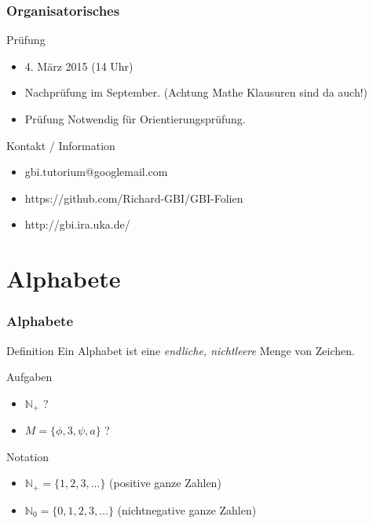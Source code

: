 \documentclass{beamer}
\begin{document}
\begin{frame}
	\frametitle {Organisatorisches}
	\begin{block}{Prüfung}
        		\begin{itemize}
			\item 4. März 2015 (14 Uhr)
			\item Nachprüfung im September. (Achtung Mathe Klausuren sind da 					auch!)
			\item Prüfung Notwendig für Orientierungsprüfung.
		\end{itemize}
	\end{block}
	
	\begin{block}{Kontakt / Information}
		\begin{itemize}
			\item gbi.tutorium@googlemail.com
			\item https://github.com/Richard-GBI/GBI-Folien
			\item http://gbi.ira.uka.de/
		\end{itemize}
	\end{block}
\end{frame}

\section{Alphabete}
\begin{frame}
	\frametitle{Alphabete}
	\begin{block}{Definition}
		Ein Alphabet ist eine \emph{endliche, nichtleere} Menge von Zeichen.
	\end{block}
	\begin{exampleblock}{Aufgaben}
		\begin{itemize}
			\item $\mathbb N$\(_{+}\) ?
			\item \(M=\{\phi,3,\psi,a\}\) ?
		\end{itemize}
	\end{exampleblock}
	\pause
	\begin{alertblock}{Notation}
		\begin{itemize}
			\item $\mathbb N$\(_{+}=\{1,2,3,\dots\}\) (positive ganze Zahlen)
			\item $\mathbb N$\(_{0}=\{0,1,2,3,\dots\}\) (nichtnegative ganze 					Zahlen)
		\end{itemize}
	\end{alertblock}
\end{frame}
\end{document}
